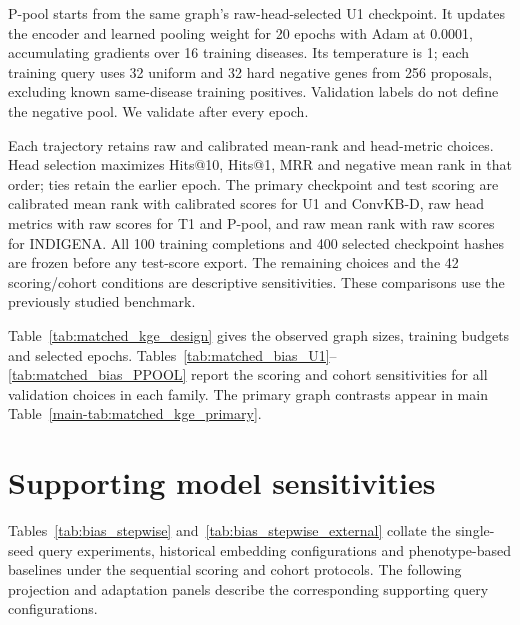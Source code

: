 \documentclass{article}
\begin{document}
P-pool starts from the same graph's raw-head-selected U1 checkpoint. It updates
the encoder and learned pooling weight for 20 epochs with Adam at 0.0001,
accumulating gradients over 16 training diseases. Its temperature is 1; each
training query uses 32 uniform and 32 hard negative genes from 256 proposals,
excluding known same-disease training positives. Validation labels do not
define the negative pool. We validate after every epoch.

Each trajectory retains raw and calibrated mean-rank and head-metric choices.
Head selection maximizes Hits@10, Hits@1, MRR and negative mean rank in that
order; ties retain the earlier epoch. The primary checkpoint and test scoring
are calibrated mean rank with calibrated scores for U1 and ConvKB-D, raw head
metrics with raw scores for T1 and P-pool, and raw mean rank with raw scores
for INDIGENA. All 100 training completions and 400 selected checkpoint hashes
are frozen before any test-score export. The remaining choices and the
42 scoring/cohort conditions are descriptive sensitivities. These comparisons
use the previously studied benchmark.

Table~\ref{tab:matched_kge_design} gives the observed graph sizes, training
budgets and selected epochs. Tables~\ref{tab:matched_bias_U1}--\ref{tab:matched_bias_PPOOL}
report the scoring and cohort sensitivities for all validation choices in
each family. The primary graph contrasts appear in main
Table~\ref{main-tab:matched_kge_primary}.

\begin{landscape}

\clearpage
\end{landscape}






\section{Supporting model sensitivities}
\label{sec:query_sensitivities}

Tables~\ref{tab:bias_stepwise} and~\ref{tab:bias_stepwise_external} collate the single-seed query experiments,
historical embedding configurations and phenotype-based baselines under the
sequential scoring and cohort protocols. The following projection and
adaptation panels describe the corresponding supporting query configurations.
\end{document}
